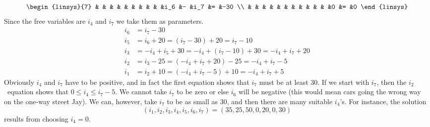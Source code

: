\begin{exercises}
\begin{answer}
\begin{exparts}
\begin{equation*}
\begin{linsys}{7}
                  &  &    &  &    &  &    &  &    &  &i_6 &- &i_7 &= &-30 \\
                  &  &    &  &    &  &    &  &    &  &    &  &0   &= &0   
            \end{linsys}
          \end{equation*}
          Since the free variables are $i_4$ and $i_7$ we take them as 
          parameters.
          \begin{equation*}
          \begin{split}
            i_6  &=  i_7-30  \\
            i_5  &=  i_6+20=(i_7-30)+20=i_7-10 \\
            i_3  &=  -i_4+i_5+30=-i_4+(i_7-10)+30=-i_4+i_7+20 \\
            i_2  &=  i_3-25=(-i_4+i_7+20)-25=-i_4+i_7-5 \\
            i_1  &=  i_2+10=(-i_4+i_7-5)+10=-i_4+i_7+5
          \end{split}
          \end{equation*}
          Obviously $i_4$ and $i_7$ have to be positive, and in fact
          the first equation shows that $i_7$ must be at least $30$.
          If we start with $i_7$, then the $i_2$~equation shows that
          $0\leq i_4\leq i_7-5$.
        \partsitem We cannot take $i_7$ to be zero or else $i_6$ will
          be negative (this would mean cars going the wrong way on the
          one-way street Jay).
          We can, however, take $i_7$ to be as small as $30$, and then 
          there are many suitable $i_4$'s.
          For instance, the solution
          \begin{equation*}
            (i_1,i_2,i_3,i_4,i_5,i_6,i_7)
            =
            (35,25,50,0,20,0,30)
          \end{equation*}
          results from choosing $i_4=0$.
      \end{exparts}
    \end{answer}
\end{exercises}
\endinput
